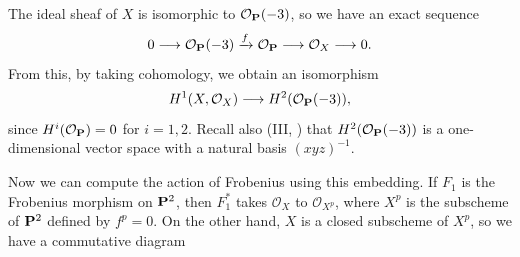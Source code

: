 {\Proof The ideal sheaf of $X$ is isomorphic to $\mathcal O_{\mathbf{P}}(-3)$, so we have an exact sequence
\[
0\longrightarrow\mathcal O_{\mathbf{P}}(-3)\xrightarrow{f}\mathcal O_{\mathbf{P}}\longrightarrow\mathcal O_X\longrightarrow0.
\]
\noindent From this, by taking cohomology, we obtain an isomorphism
\[
H^1(X,\mathcal O_X)\longrightarrow H^2(\mathcal O_{\mathbf{P}}(-3)),
\]
\noindent since $H^i(\mathcal O_{\mathbf{P}})=0$ for $i=1,2$. Recall also (III, ) that $H^2(\mathcal O_{\mathbf{P}}(-3))$ is a one-dimensional vector space with a natural basis $(xyz)^{-1}$.

Now we can compute the action of Frobenius using this embedding. If $F_1$ is the Frobenius morphism on $\mathbf{P}^2$, then $F_1^*$ takes $\mathcal O_X$ to $\mathcal O_{X^p}$, where $X^p$ is the subscheme of $\mathbf{P}^2$ defined by $f^p=0$. On the other hand, $X$ is a closed subscheme of $X^p$, so we have a commutative diagram
\begin{center}
\end{center}
}
